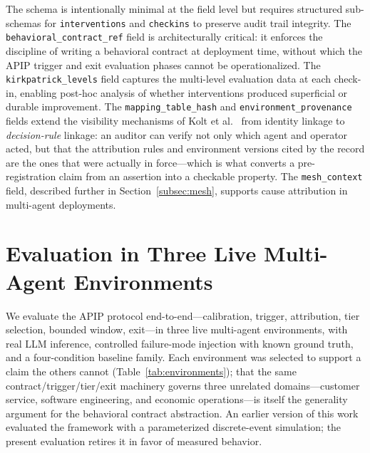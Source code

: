\documentclass[conference]{IEEEtran}
\begin{document}
The schema is intentionally minimal at the field level but requires structured
sub-schemas for \texttt{interventions} and \texttt{checkins} to preserve audit
trail integrity. The \texttt{behavioral\_contract\_ref} field is
architecturally critical: it enforces the discipline of writing a behavioral
contract at deployment time, without which the APIP trigger and exit evaluation
phases cannot be operationalized. The \texttt{kirkpatrick\_levels} field
captures the multi-level evaluation data at each check-in, enabling post-hoc
analysis of whether interventions produced superficial or durable improvement.
The \texttt{mapping\_table\_hash} and \texttt{environment\_provenance} fields
extend the visibility mechanisms of Kolt et al.~\cite{kolt2024visibility} from
identity linkage to \emph{decision-rule} linkage: an auditor can verify not
only which agent and operator acted, but that the attribution rules and
environment versions cited by the record are the ones that were actually in
force---which is what converts a pre-registration claim from an assertion into
a checkable property.
The \texttt{mesh\_context} field, described further in
Section~\ref{subsec:mesh}, supports cause attribution in multi-agent
deployments.
%
\section{Evaluation in Three Live Multi-Agent Environments}
\label{sec:simulation}

We evaluate the APIP protocol end-to-end---calibration, trigger, attribution,
tier selection, bounded window, exit---in three live multi-agent environments,
with real LLM inference, controlled failure-mode injection with known ground
truth, and a four-condition baseline family. Each environment was selected to
support a claim the others cannot (Table~\ref{tab:environments}); that the
same contract/trigger/tier/exit machinery governs three unrelated
domains---customer service, software engineering, and economic operations---is
itself the generality argument for the behavioral contract abstraction. An
earlier version of this work evaluated the framework with a parameterized
discrete-event simulation; the present evaluation retires it in favor of
measured behavior.
\end{document}
